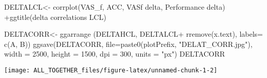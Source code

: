 \documentclass[
]{article}
\newenvironment{Shaded}{\begin{snugshade}}{\end{snugshade}}
\newcommand{\AttributeTok}[1]{\textcolor[rgb]{0.77,0.63,0.00}{#1}}
\newcommand{\DecValTok}[1]{\textcolor[rgb]{0.00,0.00,0.81}{#1}}
\newcommand{\FunctionTok}[1]{\textcolor[rgb]{0.00,0.00,0.00}{#1}}
\newcommand{\NormalTok}[1]{#1}
\newcommand{\OtherTok}[1]{\textcolor[rgb]{0.56,0.35,0.01}{#1}}
\newcommand{\SpecialCharTok}[1]{\textcolor[rgb]{0.00,0.00,0.00}{#1}}
\newcommand{\StringTok}[1]{\textcolor[rgb]{0.31,0.60,0.02}{#1}}
\begin{document}
\begin{Shaded}
\begin{Highlighting}[]
\NormalTok{ DELTALCL}\OtherTok{\textless{}{-}} \FunctionTok{corrplot}\NormalTok{(VAS\_f, ACC, }\StringTok{\textquotesingle{}VASf delta\textquotesingle{}}\NormalTok{, }\StringTok{\textquotesingle{}Performance delta\textquotesingle{}}\NormalTok{) }\SpecialCharTok{+}\FunctionTok{ggtitle}\NormalTok{(}\StringTok{\textquotesingle{}delta correlations LCL\textquotesingle{}}\NormalTok{)}

\NormalTok{ DELTACORR}\OtherTok{\textless{}{-}} \FunctionTok{ggarrange}\NormalTok{ (DELTAHCL, DELTALCL}\SpecialCharTok{+} \FunctionTok{rremove}\NormalTok{(}\StringTok{\textquotesingle{}x.text\textquotesingle{}}\NormalTok{), }\AttributeTok{labels=} \FunctionTok{c}\NormalTok{(}\StringTok{\textquotesingle{}A\textquotesingle{}}\NormalTok{, }\StringTok{\textquotesingle{}B\textquotesingle{}}\NormalTok{))}
 \FunctionTok{ggsave}\NormalTok{(DELTACORR, }\AttributeTok{file=}\FunctionTok{paste0}\NormalTok{(plotPrefix, }\StringTok{"DELAT\_CORR.jpg"}\NormalTok{), }\AttributeTok{width =} \DecValTok{2500}\NormalTok{, }\AttributeTok{height =} \DecValTok{1500}\NormalTok{, }\AttributeTok{dpi =} \DecValTok{300}\NormalTok{, }\AttributeTok{units =} \StringTok{"px"}\NormalTok{)}
\NormalTok{ DELTACORR}
\end{Highlighting}
\end{Shaded}

\texttt{[image: ALL\_TOGETHER\_files/figure-latex/unnamed-chunk-1-2]}
\end{document}
